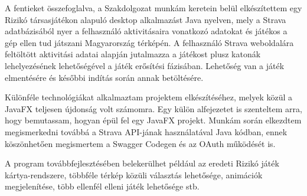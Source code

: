 A fentieket összefoglalva, a Szakdolgozat munkám keretein belül elkészítettem egy Rizikó társasjátékon alapuló desktop alkalmazást Java nyelven, mely a Strava adatbázisából nyer a felhasználó aktivitásaira vonatkozó adatokat és játékos a gép ellen tud játszani Magyarország térképén. A felhasználó Strava weboldalára feltöltött aktivitási adatai alapján jutalmazza a játékost plusz katonák lehelyezésének lehetőségével a játék erősítési fázisában. Lehetőség van a játék elmentésére és későbbi indítás során annak betöltésére. 

Különféle technológiákat alkalmaztam projektem elkészítéséhez, melyek közül a JavaFX teljesen újdonság volt számomra. Egy külön alfejezetet is szenteltem arra, hogy bemutassam, hogyan épül fel egy JavaFX projekt. Munkám során elkezdtem megismerkedni továbbá a Strava API-jának használatával Java kódban, ennek köszönhetően megismertem a Swagger Codegen és az OAuth működését is. 

A program továbbfejlesztésében belekerülhet például az eredeti Rizikó játék kártya-rendszere, többféle térkép közüli választás lehetősége, animációk megjelenítése, több ellenfél elleni játék lehetősége stb. 